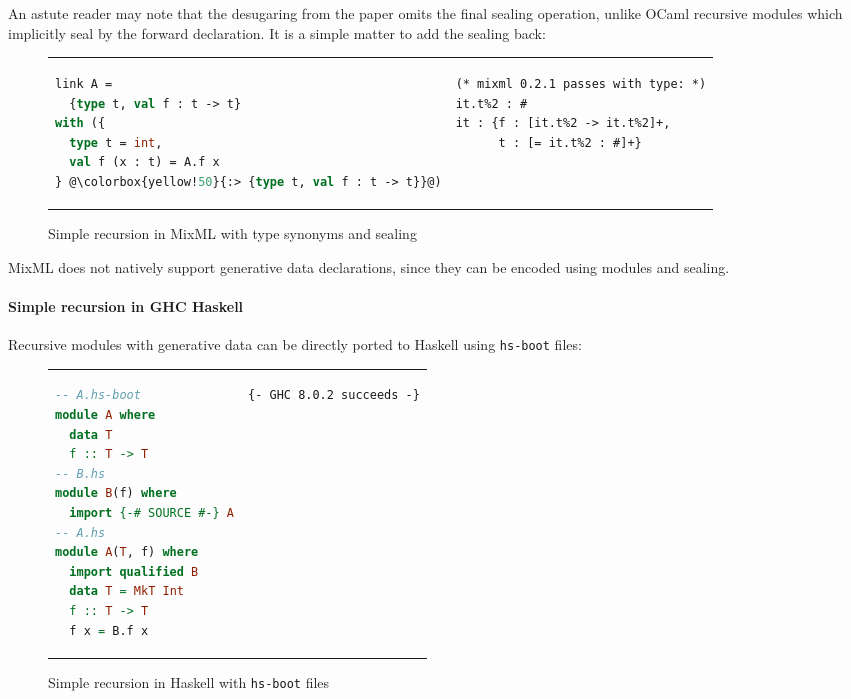 \noindent
An astute reader may note that the desugaring from the paper omits the
final sealing operation, unlike OCaml recursive modules which implicitly
seal by the forward declaration.  It is a simple matter to add the sealing back:

\begin{figure}[H]
\begin{tabular}{p{} p{}}
\begin{lstlisting}[language=ML,escapechar=@]
link A =
  {type t, val f : t -> t}
with ({
  type t = int,
  val f (x : t) = A.f x
} @\colorbox{yellow!50}{:> {type t, val f : t -> t}}@)
\end{lstlisting}
&
\begin{verbatim}
(* mixml 0.2.1 passes with type: *)
it.t%2 : #
it : {f : [it.t%2 -> it.t%2]+,
      t : [= it.t%2 : #]+}
\end{verbatim}
\end{tabular}
\caption{Simple recursion in MixML with type synonyms and sealing}
\label{fig:double-vision-simple-recursion-mixml-sealed}
\end{figure}

\noindent
MixML does not natively support generative data declarations, since they can be
encoded using modules and sealing.

\paragraph{Simple recursion in GHC Haskell} Recursive modules
with generative data can be directly ported to Haskell using \verb|hs-boot| files:

\begin{figure}[H]
\begin{tabular}{p{} p{}}
\begin{lstlisting}[language=Haskell,escapechar=@]
-- A.hs-boot
module A where
  data T
  f :: T -> T
-- B.hs
module B(f) where
  import {-# SOURCE #-} A
-- A.hs
module A(T, f) where
  import qualified B
  data T = MkT Int
  f :: T -> T
  f x = B.f x
\end{lstlisting}
&
\begin{verbatim}
{- GHC 8.0.2 succeeds -}
\end{verbatim}
\end{tabular}
\caption{Simple recursion in Haskell with \texttt{hs-boot} files}
\label{fig:double-vision-simple-recursion-haskell-hs-boot}
\end{figure}

